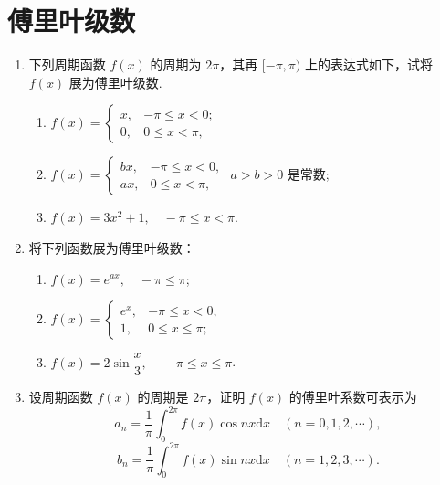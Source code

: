 \section{傅里叶级数}

\begin{enumerate}\setlength{\itemsep}{7pt}
    \item 下列周期函数 $f(x)$ 的周期为 $2\pi$，其再 $[-\pi, \pi)$ 上的表达式如下，试将 $f(x)$ 展为傅里叶级数.
    \begin{enumerate}[(1)]\setlength{\itemsep}{10pt}\setlength{\topsep}{15pt}
        \item 
        $
            f(x)=
            \begin{cases}
                x, &-\pi\leqslant x<0;\\
                0, &0\leqslant x< \pi,    
            \end{cases}
        $
        \item 
        $
            f(x)=
            \begin{cases}
                bx,&-\pi\leqslant x<0,\\
                ax,&0\leqslant x<\pi,
            \end{cases}
        $ $a>b>0$ 是常数;

        \item $f(x)=3x^2+1,\quad -\pi\leqslant x<\pi$.
    \end{enumerate}

    \item 将下列函数展为傅里叶级数：
    \begin{enumerate}[(1)]\setlength{\itemsep}{10pt}\setlength{\topsep}{15pt}
        \item $f(x)=e^{ax},\quad-\pi\leqslant \pi$;
        \item 
        $
            f(x)=
            \begin{cases}
                e^{x},&-\pi\leqslant x<0,\\
                1,&0\leqslant x\leqslant \pi;
            \end{cases}
        $

        \item $f(x)=2\sin\dfrac{x}{3},\quad -\pi\leqslant x\leqslant\pi$.
    \end{enumerate}

    \item 设周期函数 $f(x)$ 的周期是 $2\pi$，证明 $f(x)$ 的傅里叶系数可表示为
    \[
        a_n=\dfrac{1}{\pi}\int_{0}^{2\pi}f(x)\cos nx\text{d}x\quad(n=0,1,2,\cdots),
    \]
    \[
        b_n=\dfrac{1}{\pi}\int_{0}^{2\pi}f(x)\sin nx\text{d}x\quad(n=1,2,3,\cdots).
    \]
\end{enumerate}

